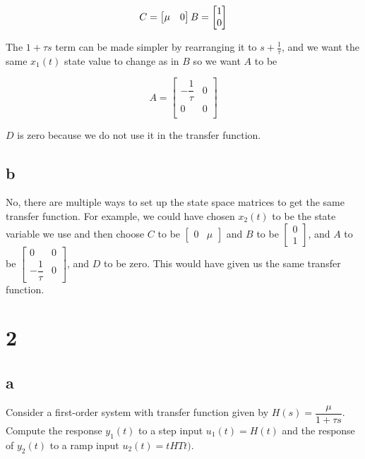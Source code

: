 \documentclass[11pt]{article}
\begin{document}
\[
    C = \begin{bmatrix} \mu & 0 \end{bmatrix} \\
    B = \begin{bmatrix} 1 \\ 0 \end{bmatrix}
\]

The $1 + \tau s$ term can be made simpler by rearranging it to $s + \frac{1}{\tau}$, and we want the same $x_1(t)$ state value to change as in $B$ so we want $A$ to be

\[
    A = \begin{bmatrix}
        -\dfrac{1}{\tau} & 0 \\
        0 & 0 \\ 
    \end{bmatrix}
\]

$D$ is zero because we do not use it in the transfer function.

\subsection{b}

No, there are multiple ways to set up the state space matrices to get the same transfer function. For example, we could have chosen $x_2(t)$ to be the state variable we use and then choose $C$ to be $\begin{bmatrix} 0 & \mu \end{bmatrix}$ and $B$ to be $\begin{bmatrix} 0 \\ 1 \end{bmatrix}$, and $A$ to be $\begin{bmatrix} 0 & 0 \\ -\dfrac{1}{\tau} & 0 \end{bmatrix}$, and $D$ to be zero. This would have given us the same transfer function.

\section{2}

\subsection{a}

Consider a first-order system with transfer function given by $H(s) = \dfrac{\mu}{1 + \tau s}$. Compute the response $y_1(t)$ to a step input $u_1(t) = H(t)$ and the response of $y_2(t)$ to a ramp input $u_2(t) = tHTt)$.
\end{document}
